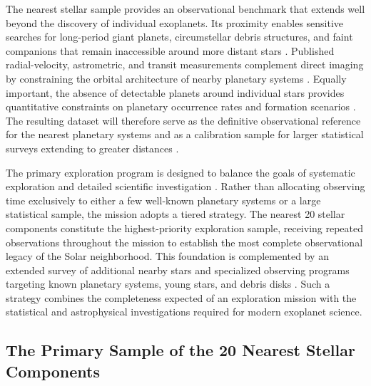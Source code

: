 The nearest stellar sample provides an observational benchmark that extends well beyond the discovery of individual exoplanets. Its proximity enables sensitive searches for long-period giant planets, circumstellar debris structures, and faint companions that remain inaccessible around more distant stars \cite{Bowler2016}. 
Published radial-velocity, astrometric, and transit measurements complement
direct imaging by constraining the orbital architecture of nearby planetary
systems \cite{LUVOIR2019}.
Equally important, the absence of detectable planets around individual stars provides quantitative constraints on planetary occurrence rates and formation scenarios 
\cite{Bowler2016}. 
The resulting dataset will therefore serve as the definitive observational reference for the nearest planetary systems and as a calibration sample for larger statistical surveys extending to greater distances \cite{LUVOIR2019}.

The primary exploration program is designed to balance the goals of systematic exploration and detailed scientific investigation \cite{LUVOIR2019,HabEx2020}. 
Rather than allocating observing time exclusively to either a few well-known planetary systems or a large statistical sample, the mission adopts a tiered strategy.
The nearest 20 stellar components constitute the highest-priority exploration sample, receiving repeated observations throughout the mission to establish the most complete observational legacy of the Solar neighborhood. This foundation is complemented by an extended survey of additional nearby stars and specialized observing programs targeting known planetary systems, young stars, and debris disks
\cite{LUVOIR2019,HabEx2020}. 
Such a strategy combines the completeness expected of an exploration mission with the statistical and astrophysical investigations required for modern exoplanet science.

\subsection{The Primary Sample of the 20 Nearest Stellar Components}

